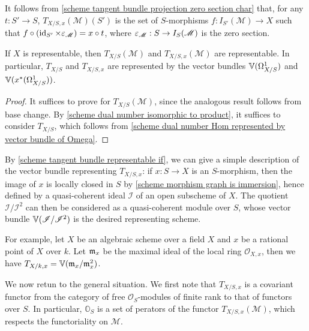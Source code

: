 \begin{remark}\label{scheme tangent bundle fiber char by morphism}
It follows from \cref{scheme tangent bundle projection zero section char} that, for any $t:S'\to S$, $T_{X/S,x}(\mathscr{M})(S')$ is the set of $S$-morphisms $f:I_{S'}(\mathscr{M})\to X$ such that $f\circ(\operatorname{id}_{S'}\times\varepsilon_\mathscr{M})=x\circ t$, where $\varepsilon_\mathscr{M}:S\to I_{S}(\mathscr{M})$ is the zero section.
\end{remark}

\begin{proposition}\label{scheme tangent bundle representable if}
If $X$ is representable, then $T_{X/S}(\mathscr{M})$ and $T_{X/S,x}(\mathscr{M})$ are representable. In particular, $T_{X/S}$ and $T_{X/S,x}$ are represented by the vector bundles $\mathbb{V}(\Omega_{X/S}^1)$ and $\mathbb{V}(x^*(\Omega_{X/S}^1))$.
\end{proposition}
\begin{proof}
It suffices to prove for $T_{X/S}(\mathscr{M})$, since the analogous result follows from base change. By \cref{scheme dual number isomorphic to product}, it suffices to consider $T_{X/S}$, which follows from \cref{scheme dual number Hom represented by vector bundle of Omega}.
\end{proof}

\begin{remark}
By \cref{scheme tangent bundle representable if}, we can give a simple description of the vector bundle representing $T_{X/S,x}$: if $x:S\to X$ is an $S$-morphism, then the image of $x$ is locally closed in $S$ by \cref{scheme morphism graph is immersion}, hence defined by a quasi-coherent ideal $\mathscr{I}$ of an open subscheme of $X$. The quotient $\mathscr{I}/\mathscr{I}^2$ can then be considered as a quasi-coherent module over $S$, whose vector bundle $\mathbb{V}(\mathscr{I}/\mathscr{I}^2)$ is the desired representing scheme.\par
For example, let $X$ be an algebraic scheme over a field $X$ and $x$ be a rational point of $X$ over $k$. Let $\mathfrak{m}_x$ be the maximal ideal of the local ring $\mathscr{O}_{X,x}$, then we have $T_{X/k,x}=\mathbb{V}(\mathfrak{m}_x/\mathfrak{m}_x^2)$.
\end{remark}

We now retun to the general situation. We first note that $T_{X/S,x}$ is a covariant functor from the category of free $\mathscr{O}_S$-modules of finite rank to that of functors over $S$. In particular, $\mathbb{O}_S$ is a set of perators of the functor $T_{X/S,x}(\mathscr{M})$, which respects the functoriality on $\mathscr{M}$.

